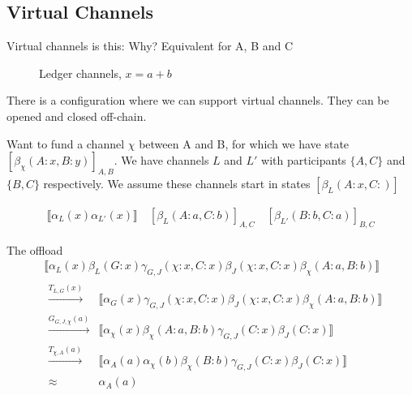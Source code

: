 \documentclass{article}
\theoremstyle{definition}
\newcommand{\adj}[1]{\llbracket #1 \rrbracket}
\newcommand{\enf}[1]{[#1]}
\begin{document}
\subsection{Virtual Channels}

Virtual channels is this: 
Why? Equivalent for A, B and C

\begin{figure}[h]\centering
\caption{Ledger channels, $x = a + b$}\label{fig:modes}
\end{figure}

There is a configuration where we can support virtual channels.
They can be opened and closed off-chain.

Want to fund a channel $\chi$ between A and B, for which we have state $\enf{\beta_\chi(A: x, B:y)}_{A,B}$. We have channels $L$ and $L'$ with participants $\{A, C\}$ and $\{B, C\}$ respectively. We assume these channels start in states $\enf{\beta_L(A:x, C:)}$

\begin{align*}
  \adj{\alpha_L(x)\alpha_{L'}(x)} \quad \enf{\beta_L(A: a, C: b)}_{A,C} \quad \enf{\beta_{L'}(B:b, C:a)}_{B, C}
\end{align*}

The offload
\begin{align*}
  & \adj{\alpha_L(x)\beta_L(G: x)\gamma_{G,J}(\chi: x, C: x)\beta_J(\chi: x, C: x)\beta_\chi(A: a, B: b)}\\ 
  & \begin{aligned}
   \xrightarrow{T_{L,G}(x)} & \adj{\alpha_G(x)\gamma_{G, J}(\chi: x, C: x)\beta_J(\chi: x, C: x)\beta_\chi(A: a, B: b)} \\
   \xrightarrow{G_{G, J, \chi}(a)} & \adj{\alpha_\chi(x)\beta_\chi(A: a, B: b)\gamma_{G, J}(C: x)\beta_J(C: x)} \\
   \xrightarrow{T_{\chi, A}(a)} & \adj{\alpha_A(a)\alpha_\chi(b)\beta_\chi(B: b)\gamma_{G, J}(C: x)\beta_J(C: x)} \\
   \approx & \alpha_A(a)
  \end{aligned}
\end{align*}
\end{document}
